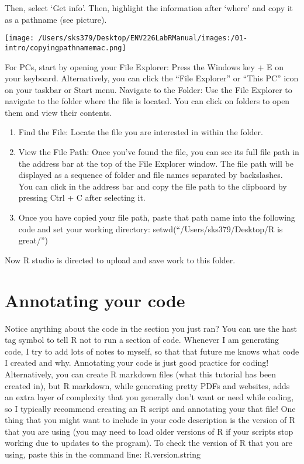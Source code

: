 \documentclass[
]{book}
\begin{document}
Then, select `Get info'. Then, highlight the information after `where' and copy it as a pathname (see picture).

\texttt{[image: /Users/sks379/Desktop/ENV226LabRManual/images:/01-intro/copyingpathnamemac.png]}

For PCs, start by opening your File Explorer:
Press the Windows key + E on your keyboard.
Alternatively, you can click the ``File Explorer'' or ``This PC'' icon on your taskbar or Start menu.
Navigate to the Folder: Use the File Explorer to navigate to the folder where the file is located. You can click on folders to open them and view their contents.

\begin{enumerate}
\def\labelenumi{\arabic{enumi}.}
\item
  Find the File: Locate the file you are interested in within the folder.
\item
  View the File Path: Once you've found the file, you can see its full file path in the address bar at the top of the File Explorer window. The file path will be displayed as a sequence of folder and file names separated by backslashes. You can click in the address bar and copy the file path to the clipboard by pressing Ctrl + C after selecting it.
\item
  Once you have copied your file path, paste that path name into the following code and set your working directory: setwd(``/Users/sks379/Desktop/R is great/'')
\end{enumerate}

Now R studio is directed to upload and save work to this folder.

\hypertarget{annotating-your-code}{%
\section{Annotating your code}\label{annotating-your-code}}

Notice anything about the code in the section you just ran? You can use the hast tag symbol to tell R not to run a section of code. Whenever I am generating code, I try to add lots of notes to myself, so that that future me knows what code I created and why. Annotating your code is just good practice for coding! Alternatively, you can create R markdown files (what this tutorial has been created in), but R markdown, while generating pretty PDFs and websites, adds an extra layer of complexity that you generally don't want or need while coding, so I typically recommend creating an R script and annotating your that file! One thing that you might want to include in your code description is the version of R that you are using (you may need to load older versions of R if your scripts stop working due to updates to the program). To check the version of R that you are using, paste this in the command line: R.version.string
\end{document}
